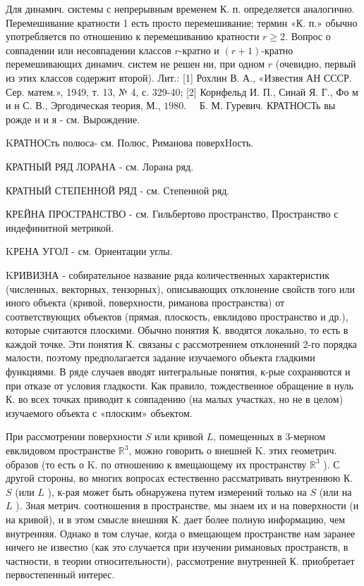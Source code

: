 \documentclass[10pt]{article}
\begin{document}
Для динамич. системы с непрерывным временем К. п. определяется аналогично. Перемешивание кратности 1 есть просто перемешивание; термин «К. п.» обычно употребляется по отношению к перемешиванию кратности $r \geqslant 2$. Вопрос о совпадении или несовпадении классов $r$-кратно и $(r+1)$-кратно перемешивающих динамич. систем не решен ни, при одном $r$ (очевидно, первый из этих классов содержит второй). Лит.: [1] Рохлин В. А., «Известия АН СССР. Сер. матем.», 1949, т. 13, № 4, с. 329-40; [2] Корнфельд И. П., Синай Я. Г., Фо м и н С. В., Эргодическая теория, М., $1980 . \quad$ Б. М. Гуревич. КРАТНОСТь вы рожде н и я - см. Вырождение.



KРАТНОСть полюса- см. Полюс, Риманова поверхHость.



КРАТНЫЙ РЯД ЛОРАНА - см. Лорана ряд.



КРАТНЫЙ СТЕПЕННОЙ РЯД - см. Степенной ряд.



КРЕЙНА ПРОСТРАНСТВО - см. Гильбертово пространство, Пространство с индефинитной метрикой.



KРЕНА УГОЛ - см. Ориентации углы.



KРИВИЗНА - собирательное название ряда количественных характеристик (численных, векторных, тензорных), описывающих отклонение свойств того или иного объекта (кривой, поверхности, риманова пространства) от соответствующих объектов (прямая, плоскость, евклидово пространство и др.), которые считаются плоскими. Обычно понятия К. вводятся локально, то есть в каждой точке. Эти понятия К. связаны с рассмотрением отклонений 2-го порядка малости, поэтому предполагается задание изучаемого объекта гладкими функциями. В ряде случаев вводят интегральные понятия, к-рые сохраняются и при отказе от условия гладкости. Как правило, тождественное обращение в нуль К. во всех точках приводит к совпадению (на малых участках, но не в целом) изучаемого объекта с «плоским» объектом.



При рассмотрении поверхности $S$ или кривой $L$, помещенных в 3-мерном евклидовом пространстве $\mathbb{R}^{3}$, можно говорить о внешней $\mathrm{K}$. этих геометрич. образов (то есть о K. по отношению к вмещающему их пространству $\mathbb{R}^{3}$ ). С другой стороны, во многих вопросах естественно рассматривать внутреннюю К. $S$ (или $L$ ), к-рая может быть обнаружена путем измерений только на $S$ (или на $L$ ). Зная метрич. соотношения в пространстве, мы знаем их и на поверхности (и на кривой), и в этом смысле внешняя К. дает более полную информацию, чем внутренняя. Однако в том случае, когда о вмещающем пространстве нам заранее ничего не известно (как это случается при изучении римановых пространств, в частности, в теории относительности), рассмотрение внутренней К. приобретает первостепенный интерес.
\end{document}
